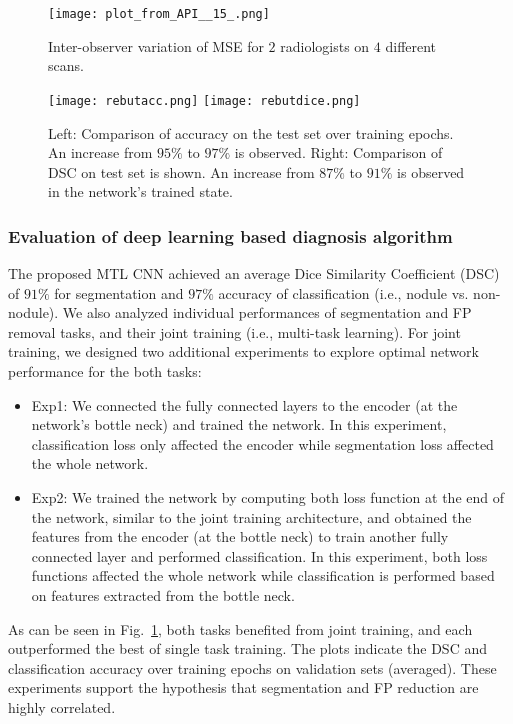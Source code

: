\documentclass[preprint,12pt]{elsarticle}
\begin{document}
\begin{figure}
\texttt{[image: plot\_from\_API\_\_15\_.png]}
\caption{Inter-observer variation of MSE for $2$ radiologists on $4$ different scans. \label{fig:lungvariationplot}}
\texttt{[image: rebutacc.png]}
 \texttt{[image: rebutdice.png]}
  \caption{Left: Comparison of accuracy on the test set over training epochs. An increase from $95\%$ to $97\%$ is observed. Right: Comparison of DSC on test set is shown. An increase from $87\%$ to $91\%$ is observed in the network's trained state.}    \label{fig:jointvssingle}
\end{figure}

\subsubsection{Evaluation of deep learning based diagnosis algorithm}
The proposed MTL CNN achieved an average Dice Similarity Coefficient (DSC) of $91\%$ for segmentation and $97\%$ accuracy of classification (i.e., nodule vs. non-nodule). We also analyzed individual performances of segmentation and FP removal tasks, and their joint training (i.e., multi-task learning). For joint training, we designed two additional experiments to explore optimal network performance for the both tasks:
\begin{itemize}
\item Exp1: We connected the fully connected layers to the encoder (at the network's bottle neck) and trained the network. In this experiment, classification loss only affected the encoder while segmentation loss affected the whole network.
\item Exp2: We trained the network by computing both loss function at the end of the network, similar to the joint training architecture, and obtained the features from the encoder (at the bottle neck) to train another fully connected layer and performed classification. In this experiment, both loss functions affected the whole network while classification is performed based on features extracted from the bottle neck.
\end{itemize}
As can be seen in Fig.~\ref{fig:jointvssingle}, both tasks benefited from joint training, and each outperformed the best of single task training. The plots indicate the DSC and classification accuracy over training epochs on validation sets (averaged). These experiments support the hypothesis that segmentation and FP reduction are highly correlated.
\end{document}

